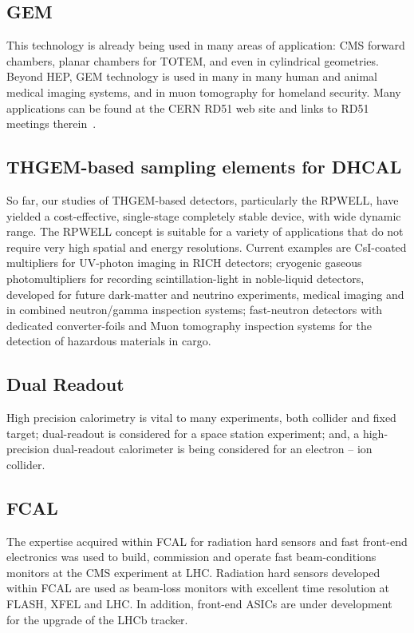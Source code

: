 \subsection{GEM}
This technology is already being used in many areas of application: CMS forward chambers, planar chambers for TOTEM, and even in cylindrical geometries. Beyond HEP, GEM technology is used in many in many human and animal medical imaging systems, and in muon tomography for homeland security. Many applications can be found at the CERN RD51 web site and links to RD51 meetings therein~\cite{RD51Collaboration}.

\subsection{THGEM-based sampling elements for DHCAL}
So far, our studies of THGEM-based detectors, particularly the RPWELL, have yielded a cost-effective, single-stage completely stable device, with wide dynamic range. The RPWELL concept is suitable for a variety of applications that do not require very high spatial and energy resolutions. Current examples are CsI-coated multipliers for UV-photon imaging in RICH detectors; cryogenic gaseous photomultipliers for recording scintillation-light in noble-liquid detectors, developed for future dark-matter and neutrino experiments, medical imaging and in combined neutron/gamma inspection systems; fast-neutron detectors with dedicated converter-foils and Muon tomography inspection systems for the detection of hazardous materials in cargo.

\subsection{Dual Readout}
High precision calorimetry is vital to many experiments, both collider and fixed target; dual-readout is considered for a space station experiment; and, a high-precision dual-readout calorimeter is being considered for an electron -- ion collider.

\subsection{FCAL}
The expertise acquired within FCAL for radiation hard sensors and fast front-end electronics was
used to build, commission and operate fast
beam-conditions monitors at the CMS experiment at LHC.
Radiation hard sensors developed within FCAL are used as beam-loss monitors
with excellent time resolution at FLASH, XFEL and LHC.
In addition, front-end ASICs are under development for the upgrade of the LHCb tracker.

